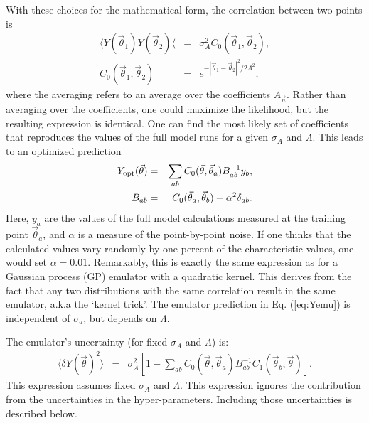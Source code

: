 \documentclass[UserManual.tex]{subfiles}
\begin{document}
With these choices for the mathematical form, the correlation between two points is
\begin{eqnarray}
\langle Y(\vec{\theta}_1)Y(\vec{\theta}_2)\langle &=& \sigma_A^2 C_0(\vec{\theta}_1,\vec{\theta}_2),\\
\nonumber
C_0(\vec{\theta}_1,\vec{\theta}_2)&=&e^{-|\vec{\theta}_1-\vec{\theta}_2|^2/2\Lambda^2},
\end{eqnarray}
where the averaging refers to an average over the coefficients $A_{\vec{n}}$. Rather than averaging over the coefficients, one could maximize the likelihood, but the resulting expression is identical. One can find the most likely set of coefficients that reproduces the values of the full model runs for a given $\sigma_A$ and $\Lambda$. This leads to an optimized prediction
\begin{eqnarray}\label{eq:Yemu}
Y_{\rm opt}(\vec{\theta})&=&\sum_{ab}C_0(\vec{\theta},\vec{\theta}_a)B^{-1}_{ab}y_b,\\
\label{eq:Bdef}
B_{ab}&=&C_0(\vec{\theta}_a,\vec{\theta}_b)+\alpha^2\delta_{ab}.
\end{eqnarray}
Here, $y_a$ are the values of the full model calculations measured at the training point $\vec{\theta}_a$, and $\alpha$ is a measure of the point-by-point noise. If one thinks that the calculated values vary randomly by one percent of the characteristic values, one would set $\alpha=0.01$. Remarkably, this is exactly the same expression as for a Gaussian process (GP) emulator with a quadratic kernel. This derives from the fact that any two distributions with the same correlation result in the same emulator, a.k.a the `kernel trick'.  The emulator prediction in Eq. (\ref{eq:Yemu}) is independent of $\sigma_a$, but depends on $\Lambda$. 

The emulator's uncertainty (for fixed $\sigma_A$ and $\Lambda$) is:
\begin{eqnarray}
\langle \delta Y(\vec{\theta})^2\rangle&=&
\sigma_A^2\left[1-\sum_{ab}C_0(\vec{\theta},\vec{\theta}_a)B^{-1}_{ab}C_1(\vec{\theta}_b,\vec{\theta})\right].
\end{eqnarray}
This expression assumes fixed $\sigma_A$ and $\Lambda$. This expression ignores the contribution from the uncertainties in the hyper-parameters. Including those uncertainties is described below.
\end{document}

